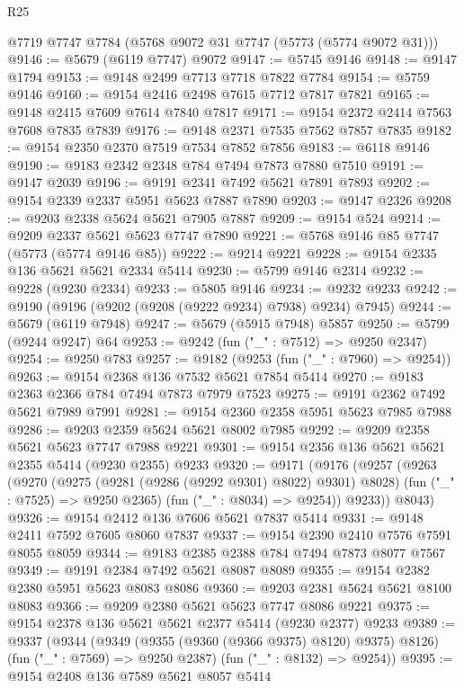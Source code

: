 \begin{lexlean}{R25}
\begin{coremodule}
    @7719
    @7747
    @7784
    (@5768 @9072 @31 @7747 (@5773 (@5774 @9072 @31)))
@9146 := @5679 (@6119 @7747) @9072
@9147 := @5745 @9146
@9148 := @9147 @1794
@9153 := @9148 @2499 @7713 @7718 @7822 @7784
@9154 := @5759 @9146
@9160 := @9154 @2416 @2498 @7615 @7712 @7817 @7821
@9165 := @9148 @2415 @7609 @7614 @7840 @7817
@9171 := @9154 @2372 @2414 @7563 @7608 @7835 @7839
@9176 := @9148 @2371 @7535 @7562 @7857 @7835
@9182 := @9154 @2350 @2370 @7519 @7534 @7852 @7856
@9183 := @6118 @9146
@9190 := @9183 @2342 @2348 @784 @7494 @7873 @7880 @7510
@9191 := @9147 @2039
@9196 := @9191 @2341 @7492 @5621 @7891 @7893
@9202 := @9154 @2339 @2337 @5951 @5623 @7887 @7890
@9203 := @9147 @2326
@9208 := @9203 @2338 @5624 @5621 @7905 @7887
@9209 := @9154 @524
@9214 := @9209 @2337 @5621 @5623 @7747 @7890
@9221 := @5768 @9146 @85 @7747 (@5773 (@5774 @9146 @85))
@9222 := @9214 @9221
@9228 := @9154 @2335 @136 @5621 @5621 @2334 @5414
@9230 := @5799 @9146 @2314
@9232 := @9228 (@9230 @2334)
@9233 := @5805 @9146
@9234 := @9232 @9233
@9242 := @9190 (@9196 (@9202 (@9208 (@9222 @9234) @7938) @9234) @7945)
@9244 := @5679 (@6119 @7948)
@9247 := @5679 (@5915 @7948) @5857
@9250 := @5799 (@9244 @9247) @64
@9253 := @9242 (fun ("_" : @7512) => @9250 @2347)
@9254 := @9250 @783
@9257 := @9182 (@9253 (fun ("_" : @7960) => @9254))
@9263 := @9154 @2368 @136 @7532 @5621 @7854 @5414
@9270 := @9183 @2363 @2366 @784 @7494 @7873 @7979 @7523
@9275 := @9191 @2362 @7492 @5621 @7989 @7991
@9281 := @9154 @2360 @2358 @5951 @5623 @7985 @7988
@9286 := @9203 @2359 @5624 @5621 @8002 @7985
@9292 := @9209 @2358 @5621 @5623 @7747 @7988 @9221
@9301 := @9154 @2356 @136 @5621 @5621 @2355 @5414 (@9230 @2355) @9233
@9320 := @9171
    (@9176
      (@9257
        (@9263
          (@9270
            (@9275 (@9281 (@9286 (@9292 @9301) @8022) @9301) @8028)
            (fun ("_" : @7525) => @9250 @2365)
            (fun ("_" : @8034) => @9254))
          @9233))
      @8043)
@9326 := @9154 @2412 @136 @7606 @5621 @7837 @5414
@9331 := @9148 @2411 @7592 @7605 @8060 @7837
@9337 := @9154 @2390 @2410 @7576 @7591 @8055 @8059
@9344 := @9183 @2385 @2388 @784 @7494 @7873 @8077 @7567
@9349 := @9191 @2384 @7492 @5621 @8087 @8089
@9355 := @9154 @2382 @2380 @5951 @5623 @8083 @8086
@9360 := @9203 @2381 @5624 @5621 @8100 @8083
@9366 := @9209 @2380 @5621 @5623 @7747 @8086 @9221
@9375 := @9154 @2378 @136 @5621 @5621 @2377 @5414 (@9230 @2377) @9233
@9389 := @9337
    (@9344
      (@9349 (@9355 (@9360 (@9366 @9375) @8120) @9375) @8126)
      (fun ("_" : @7569) => @9250 @2387)
      (fun ("_" : @8132) => @9254))
@9395 := @9154 @2408 @136 @7589 @5621 @8057 @5414

\end{coremodule}
\end{lexlean}
